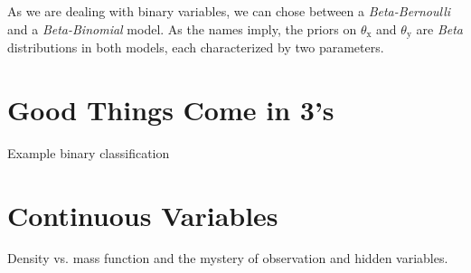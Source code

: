 \documentclass[]{report}
\begin{document}
As we are dealing with binary variables, we can chose between a \emph{Beta-Bernoulli} and a \emph{Beta-Binomial} model. As the names imply, the priors on $\theta_\mathrm{x}$ and $\theta_\mathrm{y}$ are \textit{Beta} distributions in both models, each characterized by two parameters.


\chapter{Good Things Come in 3's}
Example binary classification

\chapter{Continuous Variables}
Density vs. mass function and the mystery of observation and hidden variables.
\end{document}
